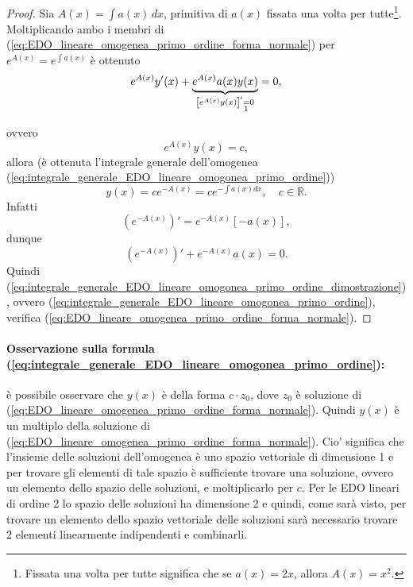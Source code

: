 \begin{proof}
	Sia $A(x)=\int a(x)\, dx$, primitiva di $a(x)$ fissata una volta per tutte\footnote{Fissata una volta per tutte significa che se $a(x)=2x$, allora $A(x)=x^2$.}. Moltiplicando ambo i membri di (\ref{eq:EDO_lineare_omogenea_primo_ordine_forma_normale}) per $e^{A(x)}=e^{\int a(x)}$ è ottenuto
	\begin{equation*}
		e^{A(x)}y'(x)+\underbrace{e^{A(x)}a(x)y(x)}_{\left[e^{A(x)}y(x)\right]'\underset{\footnotemark}{=}0}=0,
	\end{equation*}
	ovvero
	\begin{equation}\label{eq:conseguenza_th_lagrange_edo}
		e^{A(x)}y(x)=c,
	\end{equation}
	allora (è ottenuta l'integrale generale dell'omogenea (\ref{eq:integrale_generale_EDO_lineare_omogonea_primo_ordine}))
	\begin{equation}\label{eq:integrale_generale_EDO_lineare_omogonea_primo_ordine_dimostrazione}
		y(x)=ce^{-A(x)} = c e^{-\int a(x) dx},\quad c\in\mathbb R.
	\end{equation}
	Infatti
	\begin{equation*}
		\left(e^{-A(x)}\right)'= e^{-A(x)}[-a(x)],
	\end{equation*}
	dunque
	\begin{equation*}
		\left(e^{-A(x)}\right)' + e^{-A(x)}a(x)=0.
	\end{equation*}
	Quindi (\ref{eq:integrale_generale_EDO_lineare_omogonea_primo_ordine_dimostrazione}), ovvero (\ref{eq:integrale_generale_EDO_lineare_omogonea_primo_ordine}), verifica (\ref{eq:EDO_lineare_omogenea_primo_ordine_forma_normale}).
\end{proof}

\paragraph{Osservazione sulla formula (\ref{eq:integrale_generale_EDO_lineare_omogonea_primo_ordine}):} è possibile osservare che $y(x)$ è della forma $c\cdot z_0$, dove $z_0$ è soluzione di (\ref{eq:EDO_lineare_omogenea_primo_ordine_forma_normale}). Quindi $y(x)$ è un multiplo della soluzione di (\ref{eq:EDO_lineare_omogenea_primo_ordine_forma_normale}). Cio' significa che l'insieme delle soluzioni dell'omogenea è uno spazio vettoriale di dimensione 1 e per trovare gli elementi di tale spazio è sufficiente trovare una soluzione, ovvero un elemento dello spazio delle soluzioni, e moltiplicarlo per $c$. Per le EDO lineari di ordine 2 lo spazio delle soluzioni ha dimensione 2 e quindi, come sarà visto, per trovare un elemento dello spazio vettoriale delle soluzioni sarà necessario trovare 2 elementi linearmente indipendenti e combinarli.

